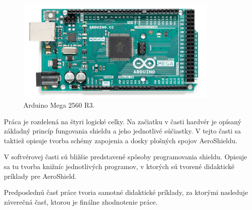 \begin{figure}[!tbh]
	\centering
	\includegraphics[width=100mm]{obr/mega.png}
	\caption{{Arduino Mega 2560 R3\cite{megafoto}.}}\label{OBRAZOK 1.32}
\end{figure}

\newpage
Práca je rozdelená na štyri logické celky. Na začiatku v časti hardvér je opísaný základný princíp fungovania shieldu a jeho jednotlivé súčiastky. V tejto časti sa taktiež opisuje tvorba schémy zapojenia a dosky plošných spojov AeroShieldu. 

V softvérovej časti sú bližšie predstavené spôsoby programovania shieldu. Opisuje sa tu tvorba knižníc jednotlivých programov, v ktorých sú tvorené didaktické príklady pre AeroShield.

Predposlednú časť práce tvoria samotné didaktické príklady, za ktorými nasleduje záverečná časť, ktorou je finálne zhodnotenie práce.




